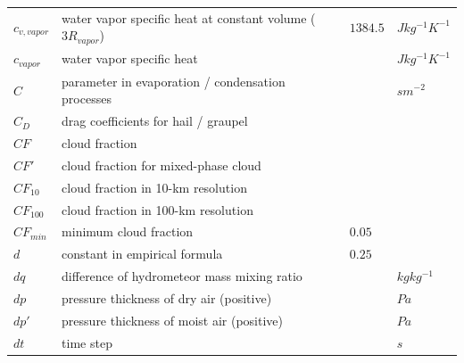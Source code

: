 \documentclass[letterpaper,titlepage,10pt]{article}
\numberwithin{equation}{section}
\begin{document}
\begin{appendices}
\begin{longtable}{p{}p{}p{}p{}}
	$c_{v,vapor}$      & water vapor specific heat at constant volume ($3 R_{vapor}$)                         & $1384.5$                   & $J kg^{-1} K^{-1}$ \\
	$c_{vapor}$        & water vapor specific heat                                                            &                            & $J kg^{-1} K^{-1}$ \\
	$C$                & parameter in evaporation / condensation processes                                    &                            & $s m^{-2}$ \\
	$C_D$              & drag coefficients for hail / graupel                                                 &                            & \\
	$CF$               & cloud fraction                                                                       &                            & \\
	$CF'$              & cloud fraction for mixed-phase cloud                                                 &                            & \\
	$CF_{10}$          & cloud fraction in 10-km resolution                                                   &                            & \\
	$CF_{100}$         & cloud fraction in 100-km resolution                                                  &                            & \\
	$CF_{min}$         & minimum cloud fraction                                                               & $0.05$                     & \\
	$d$                & constant in empirical formula                                                        & $0.25$                     & \\
	$dq$               & difference of hydrometeor mass mixing ratio                                          &                            & $kg kg^{-1}$ \\
	$dp$               & pressure thickness of dry air (positive)                                             &                            & $Pa$ \\
	$dp'$              & pressure thickness of moist air (positive)                                           &                            & $Pa$ \\
	$dt$               & time step                                                                            &                            & $s$ \\

\end{longtable}
\end{appendices}
\end{document}
